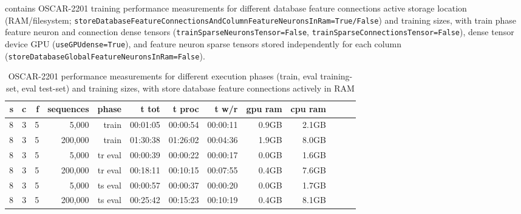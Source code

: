  contains OSCAR-2201 training performance measurements for different database feature connections active storage location (RAM/filesystem; \texttt{storeDatabaseFeatureConnectionsAndColumnFeatureNeuronsInRam=True/False}) and training sizes, with train phase feature neuron and connection dense tensors (\texttt{trainSparseNeuronsTensor=False}, \texttt{trainSparseConnectionsTensor=False}), dense tensor device GPU (\texttt{useGPUdense=True}), and feature neuron sparse tensors stored independently for each column (\texttt{storeDatabaseGlobalFeatureNeuronsInRam=False}).

\begin{table}[H]
\centering
\caption{OSCAR-2201 performance measurements for different execution phases (train, eval training-set, eval test-set) and training sizes, with store database feature connections actively in RAM}
\label{tab:oscar-performance-storeDatabaseInRamTrue}
\begin{tabular}{rrrrrrrrrrrrr}
\toprule
\textbf{s} & \textbf{c} & \textbf{f} & \textbf{sequences} & \textbf{phase} & \textbf{t tot} & \textbf{t proc} & \textbf{t w/r} & \textbf{gpu ram} & \textbf{cpu ram} \\
\midrule
8 & 3 & 5 & 5,000       & train & 00:01:05 & 00:00:54 & 00:00:11 & 0.9GB & 2.1GB \\
8 & 3 & 5 & 200,000     & train & 01:30:38 & 01:26:02 & 00:04:36 & 1.9GB & 8.0GB \\
8 & 3 & 5 & 5,000       & tr eval & 00:00:39 & 00:00:22 & 00:00:17 & 0.0GB & 1.6GB \\
8 & 3 & 5 & 200,000     & tr eval & 00:18:11 & 00:10:15 & 00:07:55 & 0.4GB & 7.6GB \\
8 & 3 & 5 & 5,000       & ts eval & 00:00:57 & 00:00:37 & 00:00:20 & 0.0GB & 1.7GB \\
8 & 3 & 5 & 200,000     & ts eval & 00:25:42 & 00:15:23 & 00:10:19 & 0.4GB & 8.1GB \\
\bottomrule
\end{tabular}
\end{table}
